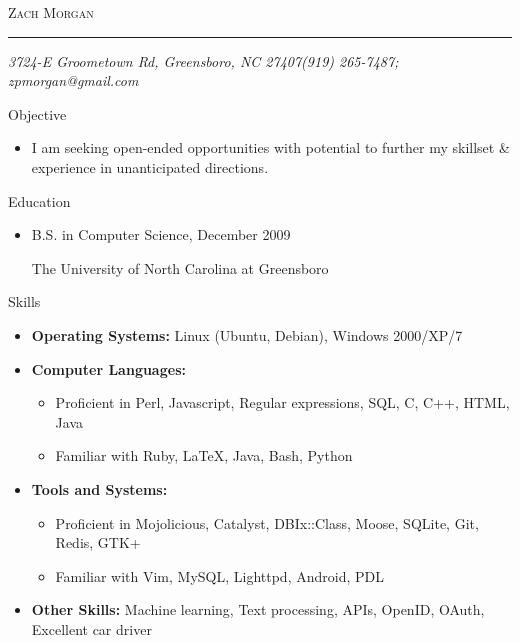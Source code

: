 \documentclass[11pt,oneside]{article}
\makeatletter
\newcommand{\name}{Zach Morgan}
\newcommand{\addr}{3724-E Groometown Rd, Greensboro, NC 27407}
\newcommand{\phone}{(919) 265-7487}
\newcommand{\email}{zpmorgan@gmail.com}
\newcommand{\bigname}[1]{
	\begin{center}\fontfamily{phv}\selectfont\Huge\scshape#1\end{center}
}
\newenvironment{ressection}[1]{
	\vspace{2pt}
	{\fontfamily{phv}\selectfont\Large#1}
	\begin{itemize}
	\vspace{3pt}
}{
	\end{itemize}
}
\newcommand{\resitem}[1]{
	\vspace{-4pt}
	\item \begin{flushleft} #1 \end{flushleft}
}
\newcommand{\ressubitem}[1]{
	\vspace{-1pt}
	\item \begin{flushleft} #1 \end{flushleft}
}
\newenvironment{reslist}[1]{
	\resitem{\textbf{#1}}
	\vspace{-5pt}
	\begin{itemize}
}{
	\end{itemize}
}
\makeatother
\begin{document}
 \selectfont

\bigname{\name}

\vspace{-8pt} \rule{\textwidth}{1pt}

\vspace{-1pt} {\small\itshape \addr \hfill \phone; \email}

\vspace{8 pt}




\begin{ressection}{Objective}

   \resitem{I am seeking open-ended opportunities with potential to further my skillset \& experience in unanticipated directions.}
	
\end{ressection}


\begin{ressection}{Education}

	\resitem{B.S. in Computer Science, December 2009}{The University of North Carolina at Greensboro}

\end{ressection}


\begin{ressection}{Skills}

	\resitem{\textbf{Operating Systems:} Linux (Ubuntu, Debian), Windows 2000/XP/7}

	\begin{reslist}{Computer Languages:}

		\ressubitem{Proficient in Perl, Javascript, Regular expressions, SQL, C, C++, HTML, Java}

		\ressubitem{Familiar with Ruby, \LaTeX, Java, Bash, Python}

	\end{reslist}

	\begin{reslist}{Tools and Systems:}

		\ressubitem{Proficient in Mojolicious, Catalyst, DBIx::Class, Moose, SQLite, Git, Redis, GTK+}

    \ressubitem{Familiar with Vim, MySQL, Lighttpd, Android, PDL}

	\end{reslist}

  \resitem{\textbf{Other Skills:}
    Machine learning, Text processing, APIs, OpenID, OAuth, Excellent car driver}

\end{ressection}
\end{document}
